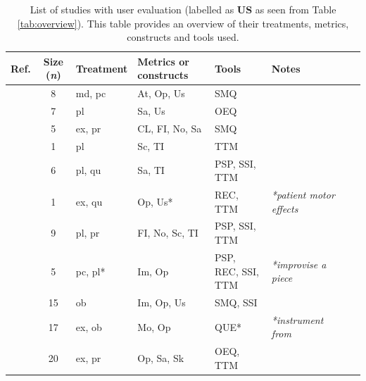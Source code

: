 \documentclass[manuscript,screen]{acmart}
\begin{document}
\begin{table}[t]
\caption{List of studies with user evaluation (labelled as \textbf{US} as seen from Table \ref{tab:overview}). This table provides an overview of their treatments, metrics, constructs and tools used.}
\label{tab: us-all}
\small\begin{tabular}{lcllllll} \hline \hline
\textbf{Ref.}                           & \textbf{Size} (\textit{n})    & \textbf{Treatment}    & \textbf{Metrics or constructs}    & \textbf{Tools} & \textbf{Notes }\\ \hline
\cite{nugraha2014pemanfaatan}        & 8        & md, pc    & At, Op, Us        & SMQ                   & \\
\cite{chow2013music}                 & 7        & pl        & Sa, Us        & OEQ                   & \\
\cite{weing2013piano}                & 5        & ex, pr    & CL, FI, No, Sa    & SMQ                   & \\
\cite{kerdvibulvech2017innovative}  & 1         & pl        & Sc, TI            & TTM                   & \\
\cite{schmalstieg2007experiences}   & 6         & pl, qu    & Sa, TI            & PSP, SSI, TTM         & \\
\cite{correa2009computer}           & 1         & ex, qu    & Op, Us*           & REC, TTM              & \textit{*patient motor effects} \\
\cite{takegawa2012piano}            & 9         & pl, pr    & FI, No, Sc, TI    & PSP, SSI, TTM         &   \\
\cite{xiao2010mirrorfugue}          & 5         & pc, pl*   & Im, Op            & PSP, REC, SSI, TTM    & \textit{*improvise a piece}\\
\cite{xiao2013mirrorfugue}          & 15        & ob        & Im, Op, Us        & SMQ, SSI              &  \\
\cite{li2018application}            & 17        & ex, ob    & Mo, Op            & QUE*                  & \textit{*instrument from }\cite{zhang2000relationship}    \\
\cite{leonard2013virtual}           & 20        & ex, pr    & Op, Sa, Sk        & OEQ, TTM              &    \\

\end{tabular}
\end{table}
\end{document}
